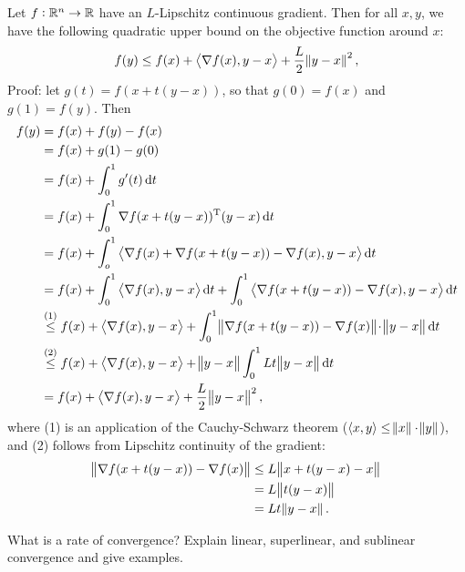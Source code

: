 \documentclass{article}
\begin{document}
Let \(f: \mathbb{R}^n \to \mathbb{R}\) have an \(L\)-Lipschitz continuous gradient.  Then for all \(x, y\), we
have the following quadratic upper bound on the objective function around \(x\):
\begin{equation*}
  f(y) \leq f(x) + \iprod{\nabla f(x)}{y - x} + \frac{L}{2}\enVert{y - x}^2,
\end{equation*}
Proof: let \(g(t) = f(x + t(y - x))\), so that \(g(0) = f(x)\) and \(g(1) = f(y)\). Then
\begin{align*}
  f(y) &= f(x) + f(y) - f(x) \\
       &= f(x) + g(1) - g(0) \\
       &= f(x) + \int_0^1 g'(t) \dif t \\
       &= f(x) + \int_0^1 \T{\nabla f(x + t(y - x))} (y - x) \dif t \\
       &= f(x) + \int_o^1 \iprod{\nabla f(x) + \nabla f(x + t(y - x)) - \nabla f(x)}{y - x} \dif t \\
       &= f(x) + \int_0^1 \iprod{\nabla f(x)}{y - x} \dif t
         + \int_0^1 \iprod{\nabla f(x + t(y - x)) - \nabla f(x)}{y - x} \dif t \\
       &\overset{(1)}{\leq} f(x) + \iprod{\nabla f(x)}{y - x}
         + \int_0^1 \enVert[1]{\nabla f(x + t(y - x)) - \nabla f(x)}\! \cdot \enVert[1]{y - x} \dif t \\
       &\overset{(2)}{\leq} f(x) + \iprod{\nabla f(x)}{y - x} + \enVert[1]{y - x} \int_0^1 Lt\enVert[1]{y - x} \dif t \\
       &= f(x) + \iprod{\nabla f(x)}{y - x} + \frac{L}{2}\enVert[1]{y - x}^2,
\end{align*}
where (1) is an application of the Cauchy-Schwarz theorem
(\(\langle x, y \rangle \leq \enVert{x} \cdot \enVert{y}\)), and (2) follows from Lipschitz
continuity of the gradient:
\begin{align*}
  \enVert{\nabla f(x + t(y - x)) - \nabla f(x)} &\leq L \enVert{x + t(y - x) - x} \\
                                                &= L \enVert{t(y - x)} \\
                                                &= Lt \enVert{y - x}.
\end{align*}

\begin{question}
  What is a rate of convergence? Explain linear, superlinear, and sublinear convergence and give
  examples.
\end{question}
\end{document}
